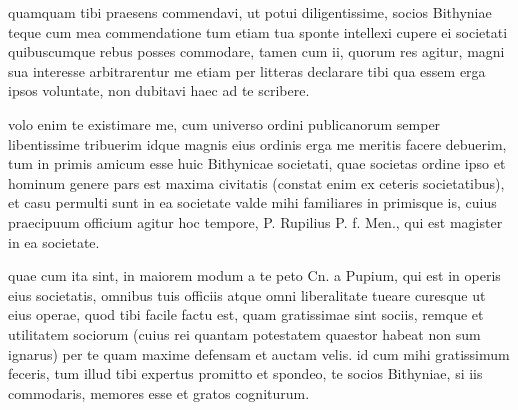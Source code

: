 


 quamquam tibi praesens commendavi, ut potui diligentissime, socios Bithyniae teque cum mea commendatione tum etiam tua sponte intellexi cupere ei societati quibuscumque rebus posses commodare, tamen cum ii, quorum res agitur, magni sua interesse arbitrarentur me etiam per litteras declarare tibi qua essem erga ipsos voluntate, non dubitavi haec ad te scribere.

 volo enim te existimare me, cum universo ordini publicanorum semper libentissime tribuerim idque magnis eius ordinis erga me meritis facere debuerim, tum in primis amicum esse huic Bithynicae societati, quae societas ordine ipso et hominum genere pars est maxima civitatis (constat enim ex ceteris societatibus), et casu permulti sunt in ea societate valde mihi familiares in primisque is, cuius praecipuum officium agitur hoc tempore, P. Rupilius P. f. Men., qui est magister in ea societate.

 quae cum ita sint, in maiorem modum a te peto Cn. a Pupium, qui est in operis eius societatis, omnibus tuis officiis atque omni liberalitate tueare curesque ut eius operae, quod tibi facile factu est, quam gratissimae sint sociis, remque et utilitatem sociorum (cuius rei quantam potestatem quaestor habeat non sum ignarus) per te quam maxime defensam et auctam velis. id cum mihi gratissimum feceris, tum illud tibi expertus promitto et spondeo, te socios Bithyniae, si iis commodaris, memores esse et gratos cogniturum.
